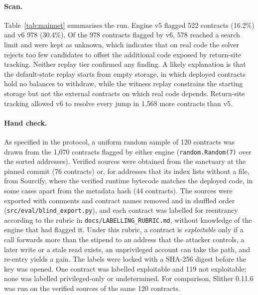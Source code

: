 \documentclass[pdflatex,sn-mathphys]{sn-jnl}
\theoremstyle{thmstyletwo}
\theoremstyle{thmstyletwo}
\begin{document}
\paragraph{Scan.} Table~\ref{tab:mainnet} summarises the run. Engine v5 flagged 522 contracts (16.2\%) and v6 978 (30.4\%). Of the 978 contracts flagged by v6, 578 reached a search limit and were kept as unknown, which indicates that on real code the solver rejects too few candidates to offset the additional code exposed by return-site tracking. Neither replay tier confirmed any finding. A likely explanation is that the default-state replay starts from empty storage, in which deployed contracts hold no balances to withdraw, while the witness replay constrains the starting storage but not the external contracts on which real code depends. Return-site tracking allowed v6 to resolve every jump in 1,568 more contracts than v5.

\paragraph{Hand check.} As specified in the protocol, a uniform random sample of 120 contracts was drawn from the 1,070 contracts flagged by either engine (\texttt{random.Random(7)} over the sorted addresses). Verified sources were obtained from the sanctuary at the pinned commit (76 contracts) or, for addresses that its index lists without a file, from Sourcify, where the verified runtime bytecode matches the deployed code, in some cases apart from the metadata hash (44 contracts). The sources were exported with comments and contract names removed and in shuffled order (\texttt{src/eval/blind\_export.py}), and each contract was labelled for reentrancy according to the rubric in \texttt{docs/LABELLING\_RUBRIC.md}, without knowledge of the engine that had flagged it. Under this rubric, a contract is \emph{exploitable} only if a call forwards more than the stipend to an address that the attacker controls, a later write or a stale read exists, an unprivileged account can take the path, and re-entry yields a gain. The labels were locked with a SHA-256 digest before the key was opened. One contract was labelled exploitable and 119 not exploitable; none was labelled privileged-only or undetermined. For comparison, Slither 0.11.6 was run on the verified sources of the same 120 contracts.
\end{document}
